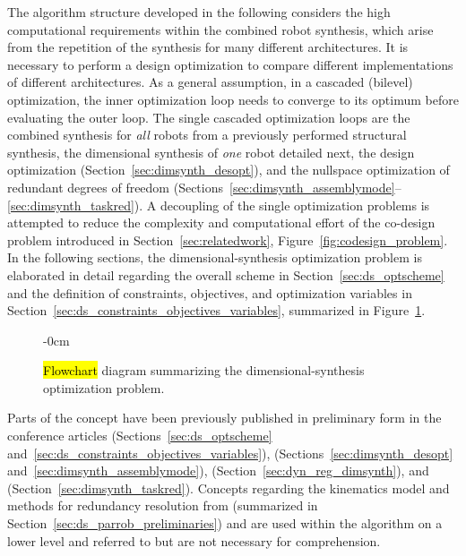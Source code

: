 %
%
%

\label{sec:materials}
%
%


The algorithm structure developed in the following considers the high computational requirements within the combined robot synthesis, which arise from the repetition of the synthesis for many different architectures.
It is necessary to perform a design optimization to compare different implementations of different architectures.
%
As a general assumption, in a cascaded (bilevel) optimization, the inner optimization loop needs to converge to its optimum before evaluating the outer loop.
%
The single cascaded optimization loops are the combined synthesis for \emph{all} robots {from a previously performed structural synthesis,} the dimensional synthesis {of \emph{one} robot} detailed next, the design optimization (Section~\ref{sec:dimsynth_desopt}), and the nullspace optimization of redundant degrees of freedom (Sections~\ref{sec:dimsynth_assemblymode}--\ref{sec:dimsynth_taskred}).
A decoupling of the single optimization problems is attempted to reduce the complexity and computational effort of the co-design problem introduced in Section~\ref{sec:relatedwork}, Figure~\ref{fig:codesign_problem}. %
In the following sections, the dimensional-synthesis optimization problem is elaborated in detail regarding the overall scheme in Section~\ref{sec:ds_optscheme} and the definition of constraints, objectives, and optimization variable{s} in Section~\ref{sec:ds_constraints_objectives_variables}, {summarized in Figure~\ref{fig:optimization_flowchart_summary}.}
%
\begin{figure}[H]
  \begin{adjustwidth}{-\extralength}{0cm}
    \centering
    \graphicspath{{Figures}}
    
  \end{adjustwidth}
  \caption{\hl{Flowchart} %
    diagram summarizing the dimensional-synthesis optimization problem.}%
\label{fig:optimization_flowchart_summary}
\end{figure}

Parts of the concept have been previously published in preliminary form in the conference articles \cite{SchapplerOrt2020} (Sections~\ref{sec:ds_optscheme} and~\ref{sec:ds_constraints_objectives_variables}), \cite{SchapplerJahRaaOrt2022} (Sections~\ref{sec:dimsynth_desopt} and~\ref{sec:dimsynth_assemblymode}), \cite{SchapplerTapOrt2019b} (Section~\ref{sec:dyn_reg_dimsynth}), and~\cite{Schappler2022_ARK3T1R} (Section~\ref{sec:dimsynth_taskred}).
Concepts regarding the kinematics model and methods for redundancy resolution from \cite{SchapplerTapOrt2019c} (summarized in Section~\ref{sec:ds_parrob_preliminaries}) and \cite{Schappler2023_ICINCOLNEE} are used within the algorithm on a lower level and referred to but are not necessary for comprehension.


